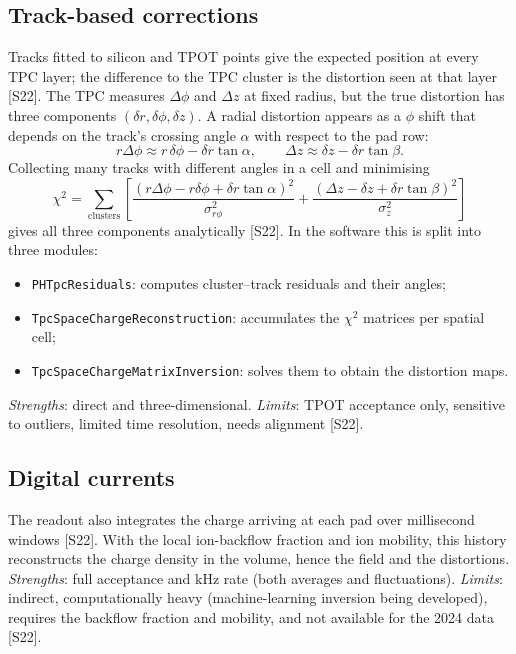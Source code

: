 \documentclass[11pt,letterpaper]{article}
\begin{document}
\subsection{Track-based corrections}
Tracks fitted to silicon and TPOT points give the expected position at every TPC layer; the difference to the TPC cluster is the distortion seen at that layer [S22].
The TPC measures $\Delta\phi$ and $\Delta z$ at fixed radius, but the true distortion has three components $(\delta r,\delta\phi,\delta z)$. A radial distortion appears as a $\phi$ shift that depends on the track's crossing angle $\alpha$ with respect to the pad row:
\begin{equation}
r\Delta\phi \approx r\,\delta\phi - \delta r\tan\alpha,\qquad \Delta z \approx \delta z - \delta r\tan\beta .
\end{equation}
Collecting many tracks with different angles in a cell and minimising
\begin{equation}
\chi^2 = \sum_{\mathrm{clusters}}\left[\frac{(r\Delta\phi - r\delta\phi + \delta r\tan\alpha)^2}{\sigma_{r\phi}^2} + \frac{(\Delta z-\delta z+\delta r\tan\beta)^2}{\sigma_z^2}\right]
\end{equation}
gives all three components analytically [S22]. In the software this is split into three modules:
\begin{itemize}
\item \texttt{PHTpcResiduals}: computes cluster--track residuals and their angles;
\item \texttt{TpcSpaceChargeReconstruction}: accumulates the $\chi^2$ matrices per spatial cell;
\item \texttt{TpcSpaceChargeMatrixInversion}: solves them to obtain the distortion maps.
\end{itemize}
\emph{Strengths}: direct and three-dimensional. \emph{Limits}: TPOT acceptance only, sensitive to outliers, limited time resolution, needs alignment [S22].

\subsection{Digital currents}
The readout also integrates the charge arriving at each pad over millisecond windows [S22]. With the local ion-backflow fraction and ion mobility, this history reconstructs the charge density in the volume, hence the field and the distortions.
\emph{Strengths}: full acceptance and kHz rate (both averages and fluctuations). \emph{Limits}: indirect, computationally heavy (machine-learning inversion being developed), requires the backflow fraction and mobility, and not available for the 2024 data [S22].
\end{document}
